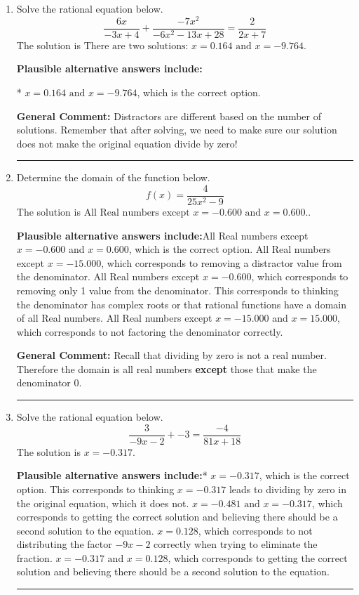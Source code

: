 \documentclass{extbook}[14pt]
\newcommand{\litem}[1]{\item #1

\rule{\textwidth}{0.4pt}}
\begin{document}
\begin{enumerate}\litem{
Solve the rational equation below.
\[ \frac{6x}{-3x + 4} + \frac{-7x^{2}}{-6x^{2} -13 x + 28} = \frac{2}{2x + 7} \]The solution is \( \text{There are two solutions: } x = 0.164 \text{ and } x = -9.764 \).\begin{enumerate}[label=\Alph*.]
\textbf{Plausible alternative answers include:}

* $x = 0.164 \text{ and } x = -9.764$, which is the correct option.


\end{enumerate}

\textbf{General Comment:} Distractors are different based on the number of solutions. Remember that after solving, we need to make sure our solution does not make the original equation divide by zero!
}
\litem{
Determine the domain of the function below.
\[ f(x) = \frac{4}{25x^{2} -9} \]The solution is \( \text{All Real numbers except } x = -0.600 \text{ and } x = 0.600. \).\begin{enumerate}[label=\Alph*.]
\textbf{Plausible alternative answers include:}All Real numbers except $x = -0.600$ and $x = 0.600$, which is the correct option.
All Real numbers except $x = -15.000$, which corresponds to removing a distractor value from the denominator.
All Real numbers except $x = -0.600$, which corresponds to removing only 1 value from the denominator.
This corresponds to thinking the denominator has complex roots or that rational functions have a domain of all Real numbers.
All Real numbers except $x = -15.000$ and $x = 15.000$, which corresponds to not factoring the denominator correctly.
\end{enumerate}

\textbf{General Comment:} Recall that dividing by zero is not a real number. Therefore the domain is all real numbers \textbf{except} those that make the denominator 0.
}
\litem{
Solve the rational equation below.
\[ \frac{3}{-9x -2} + -3 = \frac{-4}{81x + 18} \]The solution is \( x = -0.317 \).\begin{enumerate}[label=\Alph*.]
\textbf{Plausible alternative answers include:}* $x = -0.317$, which is the correct option.
This corresponds to thinking $x = -0.317$ leads to dividing by zero in the original equation, which it does not.
$x = -0.481 \text{ and } x = -0.317$, which corresponds to getting the correct solution and believing there should be a second solution to the equation.
$x = 0.128$, which corresponds to not distributing the factor $-9x -2$ correctly when trying to eliminate the fraction.
$x = -0.317 \text{ and } x = 0.128$, which corresponds to getting the correct solution and believing there should be a second solution to the equation.
\end{enumerate}

}
\end{enumerate}
\end{document}
